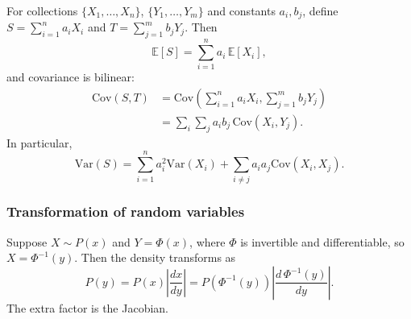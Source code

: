 \documentclass[11pt, titlepage]{article} %
\numberwithin{equation}{section}
\theoremstyle{definition}
\numberwithin{assumption}{section}
\begin{document}
For collections $\{X_1,\dots,X_n\}$, $\{Y_1,\dots,Y_m\}$ and constants $a_i,b_j$, define $S=\sum_{i=1}^n a_iX_i$ and $T=\sum_{j=1}^m b_jY_j$. Then
\begin{equation*}
    \mathbb{E}[S]=\sum_{i=1}^n a_i\,\mathbb{E}[X_i],
\end{equation*}
and covariance is bilinear:
\begin{align*}
    \mathrm{Cov}(S,T)
    &=\mathrm{Cov}\!\left(\sum_{i=1}^n a_iX_i,\sum_{j=1}^m b_jY_j\right)\\
    &=\sum_i\sum_j a_ib_j\,\mathrm{Cov}(X_i,Y_j).
\end{align*}
In particular,
\begin{equation*}
    \mathrm{Var}(S)=\sum_{i=1}^n a_i^2\mathrm{Var}(X_i)+\sum_{i\ne j}a_ia_j\mathrm{Cov}(X_i,X_j).
\end{equation*}

\subsubsection*{Transformation of random variables}

Suppose $X\sim P(x)$ and $Y=\Phi(x)$, where $\Phi$ is invertible and differentiable, so $X=\Phi^{-1}(y)$. Then the density transforms as
\begin{equation*}
    P(y)=P(x)\left|\frac{dx}{dy}\right|
    =P\!\left(\Phi^{-1}(y)\right)\left|\frac{d\,\Phi^{-1}(y)}{dy}\right|.
\end{equation*}
The extra factor is the Jacobian.
\end{document}
